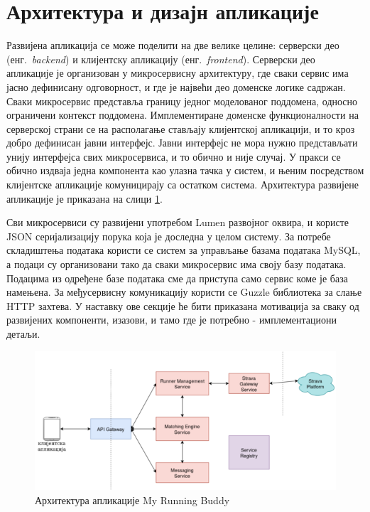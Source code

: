 \documentclass[12pt,oneside]{memoir}
\begin{document}
\section{Архитектура и дизајн апликације}
Развијена апликација се може поделити на две велике целине: серверски део (енг.~\textit{backend}) и клијентску апликацију (енг.~\textit{frontend}). Серверски део апликације је организован у микросервисну архитектуру, где сваки сервис има јасно дефинисану одговорност, и где је највећи део доменске логике садржан. Сваки микросервис представља границу једног моделованог поддомена, односно ограничени контекст поддомена. Имплементиране доменске функционалности на серверској страни се на располагање стављају клијентској апликацији, и то кроз добро дефинисан јавни интерфејс. Јавни интерфејс не мора нужно представљати унију интерфејса свих микросервиса, и то обично и није случај. У пракси се обично издваја једна компонента као улазна тачка у систем, и њеним посредством клијентске апликације комуницирају са остатком система. Архитектура развијене апликације је приказана на слици \ref{fig:my-running-buddy}.

Сви микросервиси су развијени употребом Lumen развојног оквира, и користе JSON серијализацију порука која је доследна у целом систему. За потребе складиштења података користи се систем за управљање базама података MySQL, а подаци су организовани тако да сваки микросервис има своју базу података. Подацима из одређене базе података сме да приступа само сервис коме је база намењена. За међусервисну комуникацију користи се Guzzle \cite{guzzle} библиотека за слање HTTP захтева. У наставку ове секције ће бити приказана мотивација за сваку од развијених компоненти, изазови, и тамо где је потребно - имплементациони детаљи.

\begin{figure}[!ht]
  \centering
  \includegraphics[scale=0.7]{slike/my-running-buddy.png}
  \caption{Архитектура апликације My Running Buddy}
  \label{fig:my-running-buddy}
\end{figure}
\end{document}
